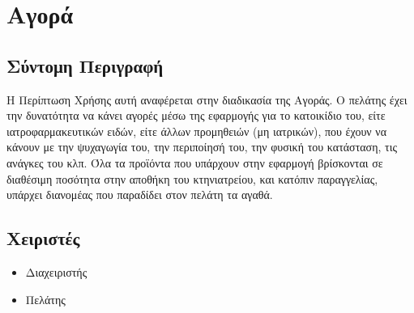 \documentclass[12pt,a4paper,twoside]{book}
\begin{document}


\section{Αγορά} %

\subsection{Σύντομη Περιγραφή}
Η Περίπτωση Χρήσης αυτή αναφέρεται στην διαδικασία της Αγοράς. Ο πελάτης έχει την δυνατότητα να κάνει αγορές μέσω της εφαρμογής για το κατοικίδιο του, είτε ιατροφαρμακευτικών ειδών, είτε άλλων προμηθειών (μη ιατρικών), που έχουν να κάνουν με την ψυχαγωγία του, την περιποίησή του, την φυσική του κατάσταση, τις ανάγκες του κλπ.  Όλα τα προϊόντα που υπάρχουν στην εφαρμογή βρίσκονται σε διαθέσιμη ποσότητα στην αποθήκη του κτηνιατρείου, και κατόπιν παραγγελίας, υπάρχει διανομέας που παραδίδει στον πελάτη τα αγαθά. %

\subsection{Χειριστές}
\begin{itemize}
  \item Διαχειριστής
  \item Πελάτης
\end{itemize}
\end{document}
